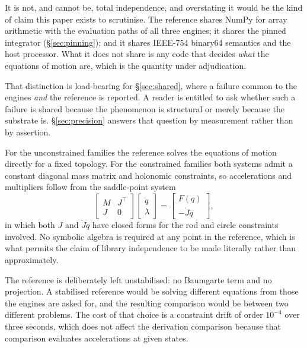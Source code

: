 \documentclass[review,12pt]{elsarticle}
\begin{document}
It is not, and cannot be, total independence, and overstating it would be the
kind of claim this paper exists to scrutinise. The reference shares NumPy for
array arithmetic with the evaluation paths of all three engines; it shares the
pinned integrator (\S\ref{sec:pinning}); and it shares IEEE-754 binary64 semantics
and the host processor. What it does not share is any code that decides \emph{what}
the equations of motion are, which is the quantity under adjudication.

That distinction is load-bearing for \S\ref{sec:shared}, where a failure common to
the engines \emph{and} the reference is reported. A reader is entitled to ask
whether such a failure is shared because the phenomenon is structural or merely
because the substrate is. \S\ref{sec:precision} answers that question by measurement rather
than by assertion.

For the unconstrained families the reference solves the equations of motion
directly for a fixed topology. For the constrained families both systems admit a
constant diagonal mass matrix and holonomic constraints, so accelerations and
multipliers follow from the saddle-point system
\begin{equation}
\begin{bmatrix} M & J^{\top} \\ J & 0 \end{bmatrix}
\begin{bmatrix} \ddot q \\ \lambda \end{bmatrix}
=
\begin{bmatrix} F(q) \\ -\dot J \dot q \end{bmatrix},
\label{eq:kkt}
\end{equation}
in which both $J$ and $\dot J\dot q$ have closed forms for the rod and circle
constraints involved. No symbolic algebra is required at any point in the
reference, which is what permits the claim of library independence to be made
literally rather than approximately.

The reference is deliberately left unstabilised: no Baumgarte term and no
projection. A stabilised reference would be solving different equations from
those the engines are asked for, and the resulting comparison would be between
two different problems. The cost of that choice is a constraint drift of order
$10^{-4}$ over three seconds, which does not affect the derivation comparison
because that comparison evaluates accelerations at given states.
\end{document}
